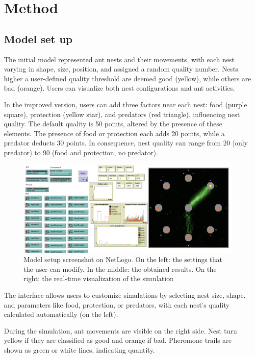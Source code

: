 \documentclass[9pt]{pnas-new}
\begin{document}
\section*{Method}
\subsection*{Model set up}
The initial model represented ant nests and their movements, with each nest varying in shape, size, position, and assigned a random quality number. Nests higher a user-defined quality threshold are deemed good (yellow), while others are bad (orange). Users can visualize both nest configurations and ant activities.

In the improved version, users can add three factors near each nest: food (purple square), protection (yellow star), and predators (red triangle), influencing nest quality. The default quality is 50 points, altered by the presence of these elements. The presence of food or protection each adds 20 points, while a predator deducts 30 points. In consequence, nest quality can range from 20 (only predator) to 90 (food and protection, no predator).

 
\begin{figure}[h!tbp]
	\centering
	\includegraphics[width=.9\linewidth]{report-template/fig/netlogo.png}
	\caption{Model setup screenshot on NetLogo. On the left: the settings that the user can modify. In the middle: the obtained results. On the right: the real-time visualization of the simulation}
	\label{fig:netlogo}
\end{figure}
The interface allows users to customize simulations by selecting nest size, shape, and parameters like food, protection, or predators, with each nest's quality calculated automatically (on the left).

During the simulation, ant movements are visible on the right side. Nest turn yellow if they are classified as good and orange if bad. Pheromone trails are shown as green or white lines, indicating quantity.
\end{document}
